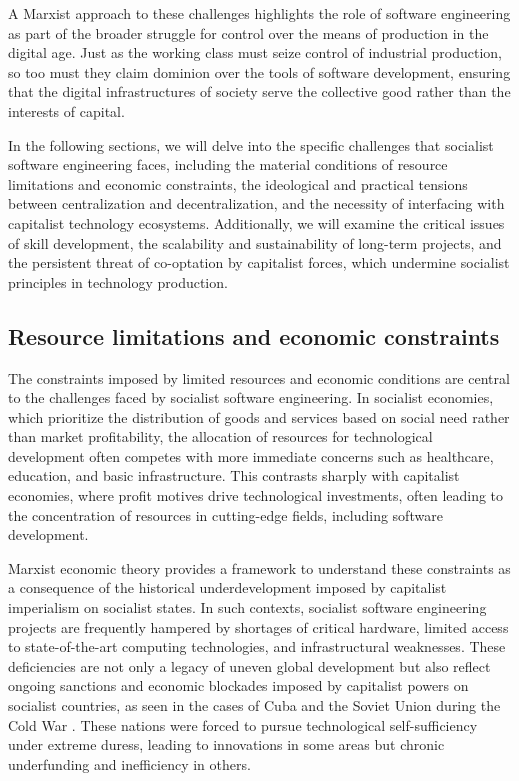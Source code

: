 \begin{refsection}
A Marxist approach to these challenges highlights the role of software engineering as part of the broader struggle for control over the means of production in the digital age. Just as the working class must seize control of industrial production, so too must they claim dominion over the tools of software development, ensuring that the digital infrastructures of society serve the collective good rather than the interests of capital.

In the following sections, we will delve into the specific challenges that socialist software engineering faces, including the material conditions of resource limitations and economic constraints, the ideological and practical tensions between centralization and decentralization, and the necessity of interfacing with capitalist technology ecosystems. Additionally, we will examine the critical issues of skill development, the scalability and sustainability of long-term projects, and the persistent threat of co-optation by capitalist forces, which undermine socialist principles in technology production.

\subsection{Resource limitations and economic constraints}

The constraints imposed by limited resources and economic conditions are central to the challenges faced by socialist software engineering. In socialist economies, which prioritize the distribution of goods and services based on social need rather than market profitability, the allocation of resources for technological development often competes with more immediate concerns such as healthcare, education, and basic infrastructure. This contrasts sharply with capitalist economies, where profit motives drive technological investments, often leading to the concentration of resources in cutting-edge fields, including software development.

Marxist economic theory provides a framework to understand these constraints as a consequence of the historical underdevelopment imposed by capitalist imperialism on socialist states. In such contexts, socialist software engineering projects are frequently hampered by shortages of critical hardware, limited access to state-of-the-art computing technologies, and infrastructural weaknesses. These deficiencies are not only a legacy of uneven global development but also reflect ongoing sanctions and economic blockades imposed by capitalist powers on socialist countries, as seen in the cases of Cuba and the Soviet Union during the Cold War \cite[pp.~134-136]{ernesto}. These nations were forced to pursue technological self-sufficiency under extreme duress, leading to innovations in some areas but chronic underfunding and inefficiency in others.


\end{refsection}
